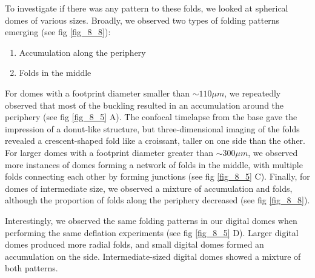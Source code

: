 To investigate if there was any pattern to these folds, we looked at spherical domes of various sizes. Broadly, we observed two types of folding patterns emerging (see fig \ref{fig_8_8}):

\begin{enumerate}
	\item Accumulation along the periphery
	\item Folds in the middle
\end{enumerate}

For domes with a footprint diameter smaller than $\sim 110 \mu m$, we repeatedly observed that most of the buckling resulted in an accumulation around the periphery (see fig \ref{fig_8_5} A). The confocal timelapse from the base gave the impression of a donut-like structure, but three-dimensional imaging of the folds revealed a crescent-shaped fold like a croissant, taller on one side than the other. For larger domes with a footprint  diameter greater than $\sim 300 \mu m$, we observed more instances of domes forming a network of folds in the middle, with multiple folds connecting each other by forming junctions (see fig \ref{fig_8_5} C). Finally, for domes of intermediate size, we observed a mixture of accumulation and folds, although the proportion of folds along the periphery decreased (see fig \ref{fig_8_8}).

Interestingly, we observed the same folding patterns in our digital domes when performing the same deflation experiments (see fig \ref{fig_8_5} D). Larger digital domes produced more radial folds, and small digital domes formed an accumulation on the side. Intermediate-sized digital domes showed a mixture of both patterns.

